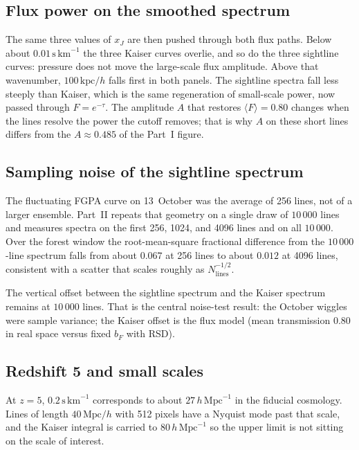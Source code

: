 \documentclass[11pt]{article}
\begin{document}
\subsection{Flux power on the smoothed spectrum}

The same three values of $x_J$ are then pushed through both flux paths.
Below about $0.01\,\mathrm{s\,km}^{-1}$ the three Kaiser curves overlie, and so do the three sightline curves: pressure does not move the large-scale flux amplitude.
Above that wavenumber, $100\,\mathrm{kpc}/h$ falls first in both panels.
The sightline spectra fall less steeply than Kaiser, which is the same regeneration of small-scale power, now passed through $F=e^{-\tau}$.
The amplitude $A$ that restores $\langle F\rangle=0.80$ changes when the lines resolve the power the cutoff removes; that is why $A$ on these short lines differs from the $A\approx 0.485$ of the Part~I figure.

\subsection{Sampling noise of the sightline spectrum}

The fluctuating FGPA curve on 13~October was the average of 256 lines, not of a larger ensemble.
Part~II repeats that geometry on a single draw of $10\,000$ lines and measures spectra on the first 256, 1024, and 4096 lines and on all $10\,000$.
Over the forest window the root-mean-square fractional difference from the $10\,000$-line spectrum falls from about $0.067$ at 256 lines to about $0.012$ at 4096 lines, consistent with a scatter that scales roughly as $N_\mathrm{lines}^{-1/2}$.

The vertical offset between the sightline spectrum and the Kaiser spectrum remains at $10\,000$ lines.
That is the central noise-test result: the October wiggles were sample variance; the Kaiser offset is the flux model (mean transmission $0.80$ in real space versus fixed $b_F$ with RSD).

\subsection{Redshift 5 and small scales}

At $z=5$, $0.2\,\mathrm{s\,km}^{-1}$ corresponds to about $27\,h\,\mathrm{Mpc}^{-1}$ in the fiducial cosmology.
Lines of length $40\,\mathrm{Mpc}/h$ with 512 pixels have a Nyquist mode past that scale, and the Kaiser integral is carried to $80\,h\,\mathrm{Mpc}^{-1}$ so the upper limit is not sitting on the scale of interest.
\end{document}
